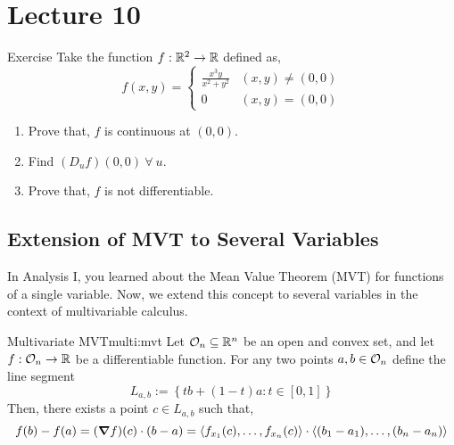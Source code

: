 \documentclass[../Analysis-3.tex]{subfiles}
\begin{document}
\chapter*{Lecture 10} %
\setcounter{chapter}{10} %
\setcounter{section}{0}
\setcounter{equation}{0}
\setcounter{figure}{0}


\begin{Eg}{Exercise}{}
  Take the function $ f:\mathbb{R}^2 \to \mathbb{R} $ defined as, \[  f(x,y) = \begin{cases}
      \frac{x^{3}y}{x^2 + y^2} & (x,y) \neq (0,0) \\
      0                        & (x,y) = (0,0)
    \end{cases}  \]
  \begin{enumerate}[label=(\roman*)]
    \item Prove that, $f$ is continuous at $(0,0)$.
    \item Find $(D_{u}f)(0,0)\ \forall\ u$.
    \item Prove that, $f$ is not differentiable.
  \end{enumerate}
\end{Eg}

\section{Extension of MVT to Several Variables}

In Analysis I, you learned about the Mean Value Theorem (MVT) for functions of a single variable. Now, we extend this concept to several variables in the context of multivariable calculus.

\begin{Thm}{Multivariate MVT}{multi:mvt}
  Let $ \mathcal{O}_{n} \subseteq \mathbb{R}^n $ be an open and convex set, and let $ f : \mathcal{O}_{n} \to \mathbb{R}$ be a differentiable function. For any two points $ a,b \in \mathcal{O}_{n} $ define the  line segment \[  L_{a,b} := \left\{ tb + (1-t)a : t \in [0,1]\right\}  \]
  Then, there exists a point $ c \in L_{a,b}$ such that,
  \[
    f(b) - f(a) = (\grad f)(c)\cdot (b-a) = \left\langle f_{x_1}(c), \ldots, f_{x_n}(c) \right\rangle \cdot \left\langle (b_1 - a_1), \ldots, (b_n - a_n) \right\rangle
  \]
\end{Thm}
\end{document}
